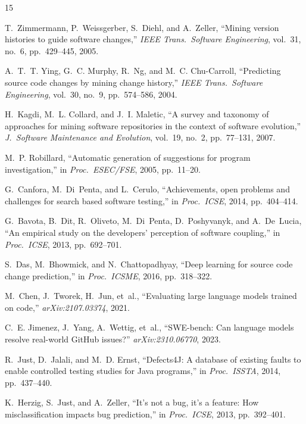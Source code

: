 \documentclass[sigconf,nonacm]{acmart}
\begin{document}

\begin{thebibliography}{15}

T.~Zimmermann, P.~Weissgerber, S.~Diehl, and A.~Zeller, ``Mining version histories to guide software changes,'' \emph{IEEE Trans.\ Software Engineering}, vol.~31, no.~6, pp.~429--445, 2005.

A.~T.~T. Ying, G.~C. Murphy, R.~Ng, and M.~C. Chu-Carroll, ``Predicting source code changes by mining change history,'' \emph{IEEE Trans.\ Software Engineering}, vol.~30, no.~9, pp.~574--586, 2004.

H.~Kagdi, M.~L. Collard, and J.~I. Maletic, ``A survey and taxonomy of approaches for mining software repositories in the context of software evolution,'' \emph{J.\ Software Maintenance and Evolution}, vol.~19, no.~2, pp.~77--131, 2007.

M.~P. Robillard, ``Automatic generation of suggestions for program investigation,'' in \emph{Proc.\ ESEC/FSE}, 2005, pp.~11--20.

G.~Canfora, M.~Di~Penta, and L.~Cerulo, ``Achievements, open problems and challenges for search based software testing,'' in \emph{Proc.\ ICSE}, 2014, pp.~404--414.

G.~Bavota, B.~Dit, R.~Oliveto, M.~Di~Penta, D.~Poshyvanyk, and A.~De~Lucia, ``An empirical study on the developers' perception of software coupling,'' in \emph{Proc.\ ICSE}, 2013, pp.~692--701.

S.~Das, M.~Bhowmick, and N.~Chattopadhyay, ``Deep learning for source code change prediction,'' in \emph{Proc.\ ICSME}, 2016, pp.~318--322.

M.~Chen, J.~Tworek, H.~Jun, et~al., ``Evaluating large language models trained on code,'' \emph{arXiv:2107.03374}, 2021.

C.~E. Jimenez, J.~Yang, A.~Wettig, et~al., ``SWE-bench: Can language models resolve real-world GitHub issues?'' \emph{arXiv:2310.06770}, 2023.

R.~Just, D.~Jalali, and M.~D. Ernst, ``Defects4J: A database of existing faults to enable controlled testing studies for Java programs,'' in \emph{Proc.\ ISSTA}, 2014, pp.~437--440.

K.~Herzig, S.~Just, and A.~Zeller, ``It's not a bug, it's a feature: How misclassification impacts bug prediction,'' in \emph{Proc.\ ICSE}, 2013, pp.~392--401.


\end{thebibliography}
\end{document}
